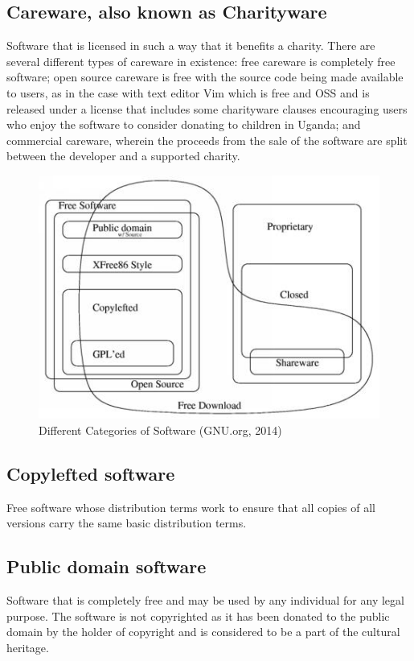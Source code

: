  \subsection*{Careware, also known as Charityware} 
Software that is licensed in such a way that it benefits a charity. There are several different types of careware in existence: free careware is completely free software; open source careware is free with the source code being made available to users, as in the case with text editor Vim which is free and OSS and is released under a license that includes some charityware clauses encouraging users who enjoy the software to consider donating to children in Uganda; and commercial careware, wherein the proceeds from the sale of the software are split between the developer and a supported charity. 
    \begin{figure}[H]
        \includegraphics[scale=0.97]{img/free-open.jpg}
      \caption{Different Categories of Software (GNU.org, 2014)}
      \label{fig:categoriesofsoftware}
    \end{figure}
 \subsection*{Copylefted software}
Free software whose distribution terms work to ensure that all copies of all versions carry the same basic distribution terms.
    \subsection*{Public domain software}
    Software that is completely free and may be used by any individual for any legal purpose. The software is not copyrighted as it has been donated to the public domain by the holder of copyright and is considered to be a part of the cultural heritage.
